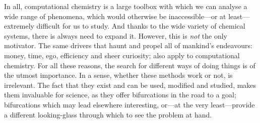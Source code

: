 In all, computational chemistry is a large toolbox with which we can analyse a wide range of phenomena, which would otherwise be inaccessible---or at least---extremely difficult for us to study. And thanks to the wide variety of chemical systems, there is always need to expand it. However, this is \emph{not} the only motivator. The same drivers that haunt and propel all of mankind's endeavours: money, time, ego, efficiency and sheer curiosity; also apply to computational chemistry. For all these reasons, the search for different ways of doing things is of the utmost importance. In a sense, whether these methods work or not, is irrelevant. The fact that they exist and can be used, modified and studied, makes them invaluable for science, as they offer bifurcations in the road to a goal; bifurcations which may lead elsewhere interesting, or---at the very least---provide a different looking-glass through which to see the problem at hand.
